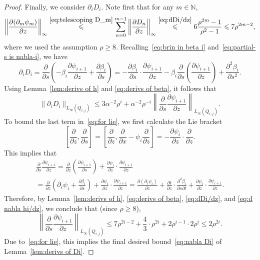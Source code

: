 \documentclass[11pt,reqno]{amsart}
\newcommand{\N}{\mathbb{N}}
\newcommand{\0}{\mathbf{0}}
\renewcommand{\1}{\mathbf 1}
\renewcommand{\ge}{\geqslant}
\renewcommand{\le}{\leqslant}
\theoremstyle{remark}
\begin{document}
\begin{proof}
  Finally, we consider $\partial_i D_i$. Note first that for any $m\in \N$,
  \begin{equation}\label{eq:d nabla hi/dz}
    \left\|\frac{\partial (\partial_{m}\psi_m)}{\partial z} \right\|_\infty \stackrel{\eqref{eq:telescoping D_m}}{\le} \sum_{n=0}^{m-1}\left\|\frac{\partial D_n}{\partial z}\right\|_\infty \stackrel{\eqref{eq:dDi/dz}}{\le} 6\frac{\rho^{2m}-1}{\rho^2-1}\le  7\rho^{2m-2},
  \end{equation}
where we used the assumption $\rho\ge 8$. Recalling~\eqref{eq:brin in beta i} and~\eqref{eq:partial-s is nabla-i}, we have
  \begin{equation*}
    \partial_i D_i
    =\frac{\partial}{\partial s}\left( -\beta_i\frac{\partial \psi_{i+1}}{\partial z}+\frac{\partial \beta_i}{\partial s}\right)
    =-\frac{\partial \beta_i}{\partial s} \cdot \frac{\partial \psi_{i+1}}{\partial z}-\beta_i\frac{\partial}{\partial s}\left(\frac{\partial \psi_{i+1}}{\partial z}\right)+\frac{\partial^2 \beta_i}{\partial s^2}.
  \end{equation*}
  Using Lemma~\ref{lem:derivs of h} and \eqref{eq:derivs of beta}, it follows that
  \begin{equation}\label{eq:for lie}
  \|\partial_iD_i\|_{L_\infty(Q_{i,j})}\le 3 \alpha^{-2}\rho^i+\alpha^{-2}\rho^{-i}\left\|\frac{\partial}{\partial s}\frac{\partial \psi_{i+1}}{\partial z}\right\|_{L_\infty(Q_{i,j})}.\end{equation}
To bound the last term in~\eqref{eq:for lie}, we first calculate the Lie bracket
  $$\left[\frac{\partial}{\partial z}, \frac{\partial}{\partial s}\right]=\left[\frac{\partial}{\partial z}, \frac{\partial}{\partial x}-\psi_i \frac{\partial}{\partial z}\right]=-\frac{\partial \psi_i}{\partial z}\cdot \frac{\partial}{\partial z}.$$
  This implies that
  \begin{multline*}
  \frac{\partial}{\partial s}\frac{\partial \psi_{i+1}}{\partial z}=\frac{\partial}{\partial z}\left(\frac{\partial \psi_{i+1}}{\partial s}\right)+\frac{\partial \psi_i}{\partial z}\cdot \frac{\partial \psi_{i+1}}{\partial z}\\=
  \frac{\partial}{\partial z}\left(\partial_{i}\psi_i+ \frac{\partial \beta_i}{\partial s}\right)+\frac{\partial \psi_i}{\partial z}\cdot \frac{\partial \psi_{i+1}}{\partial z}=  \frac{\partial (\partial_{i}\psi_i)}{\partial z} +\frac{\partial t}{\partial z}\cdot \frac{\partial^2\beta_i}{\partial s\partial t}+\frac{\partial \psi_i}{\partial z}\cdot \frac{\partial \psi_{i+1}}{\partial z}.
  \end{multline*}
Therefore,  by Lemma~\ref{lem:derivs of h}, \eqref{eq:derivs of beta}, \eqref{eq:dDi/dz}, and \eqref{eq:d nabla hi/dz}, we conclude that (since $\rho\ge 8$),
  \begin{equation*}
    \left\|\frac{\partial}{\partial s}\frac{\partial \psi_{i+1}}{\partial z}\right\|_{L_\infty(Q_{i,j})}
    \le 7\rho^{2i-2} +\frac{4}{3}\cdot \rho^{2i}+2 \rho^{i-1}\cdot 2 \rho^i
    \le 2\rho^{2i}.
  \end{equation*}
Due to~\eqref{eq:for lie},  this implies the final desired bound~\eqref{eq:nabla Di} of Lemma~\ref{lem:derivs of Di}.
\end{proof}
\end{document}
